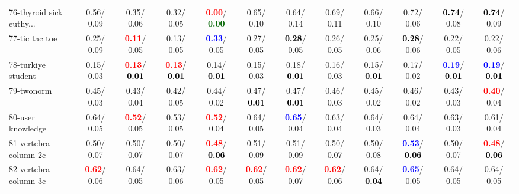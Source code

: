 \begin{table}[h]
\begin{center}
{\begin{tabular}{lc|c|c|c|c|c|c|c|c|c|c}
76-thyroid sick euthy... &   0.56/  0.09 &   0.35/  0.06 &   0.32/  0.05 & \textcolor{red}{\textbf{  0.00}}/\textcolor{darkgreen}{\textbf{  0.00}} &   0.65/  0.10 &   0.64/  0.14 &   0.69/  0.11 &   0.66/  0.10 &   0.72/  0.06 & \textcolor{black}{\textbf{  0.74}}/  0.08 & \textcolor{black}{\textbf{  0.74}}/  0.09 \\
77-tic tac toe &   0.25/  0.09 & \textcolor{red}{\textbf{  0.11}}/  0.05 &   0.13/  0.05 & \underline{\textcolor{blue}{\textbf{  0.33}}}/  0.05 &   0.27/  0.05 & \textcolor{black}{\textbf{  0.28}}/  0.05 &   0.26/  0.05 &   0.25/  0.06 & \textcolor{black}{\textbf{  0.28}}/  0.06 &   0.22/  0.05 &   0.22/  0.06 \\
78-turkiye student &   0.15/  0.03 & \textcolor{red}{\textbf{  0.13}}/\textcolor{black}{\textbf{  0.01}} & \textcolor{red}{\textbf{  0.13}}/\textcolor{black}{\textbf{  0.01}} &   0.14/\textcolor{black}{\textbf{  0.01}} &   0.15/  0.03 &   0.18/\textcolor{black}{\textbf{  0.01}} &   0.16/  0.03 &   0.15/\textcolor{black}{\textbf{  0.01}} &   0.17/  0.02 & \textcolor{blue}{\textbf{  0.19}}/\textcolor{black}{\textbf{  0.01}} & \textcolor{blue}{\textbf{  0.19}}/\textcolor{black}{\textbf{  0.01}} \\ \hline
79-twonorm &   0.45/  0.03 &   0.43/  0.04 &   0.42/  0.05 &   0.44/  0.02 &   0.47/\textcolor{black}{\textbf{  0.01}} &   0.47/\textcolor{black}{\textbf{  0.01}} &   0.46/  0.03 &   0.45/  0.02 &   0.46/  0.02 &   0.43/  0.03 & \textcolor{red}{\textbf{  0.40}}/  0.04 \\
80-user knowledge &   0.64/  0.05 & \textcolor{red}{\textbf{  0.52}}/  0.05 &   0.53/  0.05 & \textcolor{red}{\textbf{  0.52}}/  0.04 &   0.64/  0.05 & \textcolor{blue}{\textbf{  0.65}}/  0.04 &   0.63/  0.04 &   0.64/  0.03 &   0.64/  0.04 &   0.63/  0.03 &   0.61/  0.04 \\
81-vertebra column 2c &   0.50/  0.07 &   0.50/  0.07 &   0.50/  0.07 & \textcolor{red}{\textbf{  0.48}}/\textcolor{black}{\textbf{  0.06}} &   0.51/  0.09 &   0.51/  0.09 &   0.50/  0.07 &   0.50/  0.08 & \textcolor{blue}{\textbf{  0.53}}/\textcolor{black}{\textbf{  0.06}} &   0.50/  0.07 & \textcolor{red}{\textbf{  0.48}}/\textcolor{black}{\textbf{  0.06}} \\
82-vertebra column 3c & \textcolor{red}{\textbf{  0.62}}/  0.06 &   0.64/  0.05 &   0.63/  0.06 & \textcolor{red}{\textbf{  0.62}}/  0.05 & \textcolor{red}{\textbf{  0.62}}/  0.05 & \textcolor{red}{\textbf{  0.62}}/  0.07 & \textcolor{red}{\textbf{  0.62}}/  0.06 &   0.64/\textcolor{black}{\textbf{  0.04}} & \textcolor{blue}{\textbf{  0.65}}/  0.05 &   0.64/  0.05 &   0.64/  0.05 \\

\end{tabular}}
\end{center}
\end{table}
